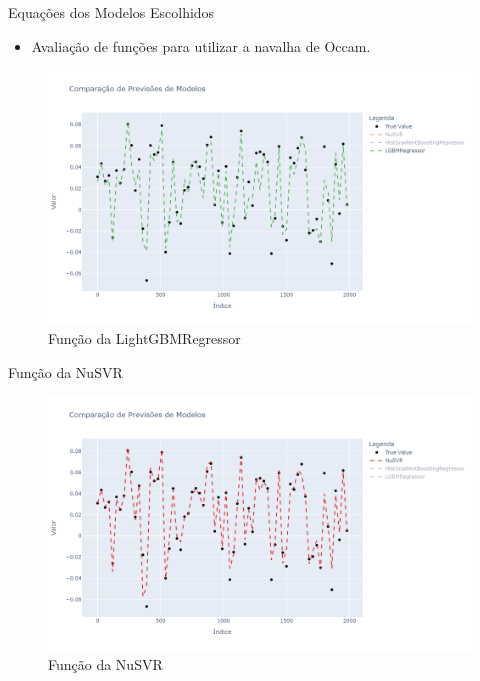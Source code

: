 \documentclass{beamer}
\begin{document}
\begin{frame}{Equações dos Modelos Escolhidos}
    \begin{itemize}
        \item Avaliação de funções para utilizar a navalha de Occam.
    \end{itemize}
    \begin{figure}[H]
        \centering
        \includegraphics[width=1\linewidth]{LGBMRegressor_func.png}
        \caption{Função da LightGBMRegressor}
    \end{figure}
\end{frame}

\begin{frame}{Função da NuSVR}
    \begin{figure}[H]
        \centering
        \includegraphics[width=1\linewidth]{NuSVR_Func.png}
        \caption{Função da NuSVR}
    \end{figure}
\end{frame}
\end{document}
